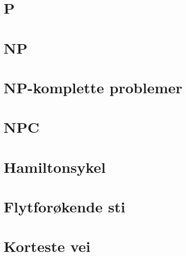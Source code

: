 \documentclass{article}
\begin{document}
\section{P}
\section{NP}
\section{NP-komplette problemer}
\section{NPC}
\section{Hamiltonsykel}
\section{Flytforøkende sti}
\section{Korteste vei}
\end{document}
